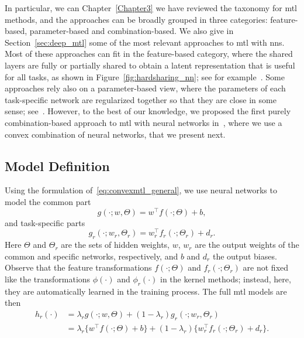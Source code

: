 %
In particular, we can  Chapter~\ref{Chapter3} we have reviewed the taxonomy for \acrshort{mtl} methods, and the approaches can be broadly grouped in three categories: feature-based, parameter-based and combination-based. 
We also give in Section~\ref{sec:deep_mtl} some of the most relevant approaches to \acrshort{mtl} with \acrshort{nns}. Most of these approaches can fit in the feature-based category, where the shared layers are fully or partially shared to obtain a latent representation that is useful for all tasks, as shown in Figure~\ref{fig:hardsharing_nn}; see for example~\cite{Caruana97, MisraSGH16,RuderBAS17}. Some approaches rely also on a parameter-based view, where the parameters of each task-specific network are regularized together so that they are close in some sense; see~\cite{Long015a, YangH17a}.
However, to the best of our knowledge, we proposed the first purely combination-based approach to \acrshort{mtl} with neural networks in~\cite{RuizAD22_hais}, where we use a convex combination of neural networks, that we present next.



\subsection{Model Definition}
Using the formulation of~\eqref{eq:convexmtl_general}, we use neural networks to model the common part 
$$ g(\cdot; w, \Theta) = w^\intercal f(\cdot; \Theta) + b,$$
and task-specific parts
$$ g_r(\cdot; w_r, \Theta_r) =  w_r^\intercal f_r(\cdot; \Theta_r) + d_r.$$
Here $\Theta$ and $\Theta_r$ are the sets of hidden weights, $w$, $w_r$ are the output weights of the common and specific networks, respectively, and $b$ and $d_r$ the output biases.
Observe that the feature transformations $ f(\cdot; \Theta)$ and $f_r(\cdot; \Theta_r)$ are not fixed like the transformations $\phi(\cdot)$ and $\phi_r(\cdot)$ in the kernel methods; instead, here, they are automatically learned in the training process.
The full \acrshort{mtl} models are then
\begin{equation}
    \label{eq:convexmtl_nn}
    \begin{aligned}
        h_r(\cdot) &= \lambda_r g(\cdot; w, \Theta) + (1 - \lambda_r) g_r(\cdot; w_r, \Theta_r)
       \\&= \lambda_r \lbrace w^\intercal f(\cdot; \Theta) + b \rbrace + (1 - \lambda_r) \lbrace w_r^\intercal f_r(\cdot; \Theta_r) + d_r \rbrace.
    \end{aligned}    
\end{equation}

